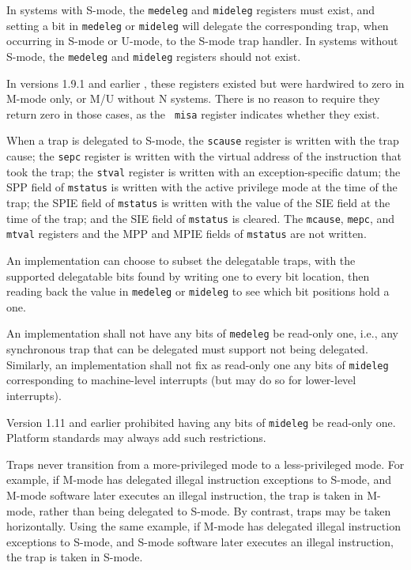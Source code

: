 In systems with S-mode, the {\tt medeleg} and {\tt mideleg} registers
must exist, and setting a bit in
{\tt medeleg} or {\tt mideleg} will delegate the corresponding trap, when
occurring in S-mode or U-mode, to the S-mode trap handler.
In systems without S-mode, the {\tt medeleg} and {\tt mideleg} registers
should not exist.

\begin{commentary}
  In versions 1.9.1 and earlier , these registers existed but were
  hardwired to zero in M-mode only, or M/U without N systems.  There
  is no reason to require they return zero in those cases, as the {\tt
    misa} register indicates whether they exist.
\end{commentary}


When a trap is delegated to S-mode, the
{\tt scause} register is written with the trap cause; the
{\tt sepc} register is written with the virtual address of
the instruction that took the trap; the
{\tt stval} register is written with an
exception-specific datum; the SPP field
of {\tt mstatus} is written with the active privilege mode at the time of
the trap; the SPIE field of {\tt mstatus} is written with the
value of the SIE field at the time of the trap; and
the SIE field of {\tt mstatus} is cleared.
The {\tt mcause}, {\tt mepc}, and {\tt mtval} registers and the MPP and
MPIE fields of {\tt mstatus} are not written.

An
implementation can choose to subset the delegatable traps, with the
supported delegatable bits found by writing one to every bit location,
then reading back the value in {\tt medeleg} or {\tt mideleg} to see
which bit positions hold a one.

An implementation shall not have any bits of {\tt medeleg} be read-only one, i.e.,
any synchronous trap that can be delegated must support not being delegated.
Similarly, an implementation shall not fix as read-only one any bits of
{\tt mideleg} corresponding to machine-level interrupts (but may do so
for lower-level interrupts).

\begin{commentary}
Version 1.11 and earlier prohibited having any bits of {\tt mideleg}
be read-only one.
Platform standards may always add such restrictions.
\end{commentary}

Traps never transition from a more-privileged mode to a less-privileged mode.
For example, if M-mode has delegated illegal instruction exceptions to S-mode, and
M-mode software later executes an illegal instruction, the trap is taken in
M-mode, rather than being delegated to S-mode.  By contrast, traps may be
taken horizontally.  Using the same example, if M-mode has delegated illegal
instruction exceptions to S-mode, and S-mode software later executes an illegal
instruction, the trap is taken in S-mode.

